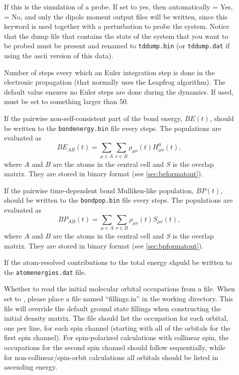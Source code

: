 \begin{description}
\item[] If this is the simulation of a probe. If set to yes,
  then automatically  = Yes,  = No, and
  only the dipole moment output files will be written, since this
  keyword is used together with a  perturbation to probe the
  system. Notice that the dump file that contains the state of the
  system that you want to be probed must be present and renamed to
  \verb|tddump.bin| (or \verb|tddump.dat| if using the ascii
  version of this data).

\item[] Number of steps every which an Euler
  integration step is done in the electronic propagation (that
  normally uses the Leapfrog algorithm). The default value ensures no
  Euler steps are done during the dynamics. If used, must be set to
  something larger than 50.

\item[] If the pairwise non-self-consistent part of the bond
  energy, $BE(t)$, should be written to the \verb|bondenergy.bin| file every
   steps. The populations are evaluated as
  \begin{equation*}
    BE_{AB}(t) = \sum_{\mu \in A} \sum_{\nu \in B} \rho_{\mu \nu}(t) H^0_{\mu
      \nu}(t),
  \end{equation*}
  where $A$ and $B$ are the atoms in the central cell and $S$ is the overlap
  matrix. They are stored in binary format (see \ref{sec:beformatout}).

\item[] If the pairwise time-dependent bond
  Mulliken-like population,  $BP(t)$, should be written
  to the \verb|bondpop.bin| file every  steps. The
  populations are evaluated as
  \begin{equation*}
    BP_{AB} (t) = \sum_{\mu \in A} \sum_{\nu \in B} \rho_{\mu \nu}(t) S_{\mu
      \nu}(t),
  \end{equation*}
  where $A$ and $B$ are the atoms in the central cell and $S$ is the overlap
  matrix. They are stored in binary format (see \ref{sec:bpformatout}).

\item[] If the atom-resolved contributions to the total energy
shpuld be written to the \verb|atomenergies.dat| file.

\item[] Whether to read the initial molecular orbital
    occupations from a file. When set to , please place a file named
    ``fillings.in'' in the working directory. This file will override the
    default ground state fillings when constructing the initial density matrix.
    The file should list the occupation for each orbital, one per line, for each spin
    channel (starting with all of the orbitals for the first spin channel). For
    spin-polarized calculations with collinear spin, the occupations for the
    second spin channel should follow sequentially, while for non-collinear/spin-orbit calculations all orbitals should be listed in ascending energy.


\end{description}
